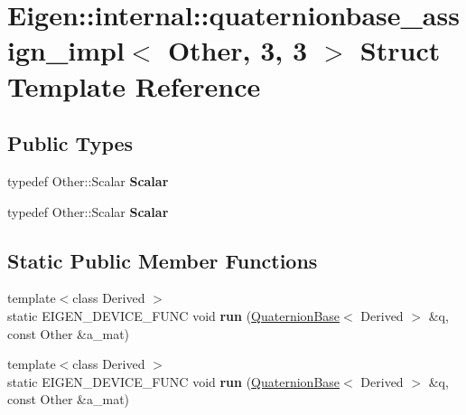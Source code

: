\hypertarget{struct_eigen_1_1internal_1_1quaternionbase__assign__impl_3_01_other_00_013_00_013_01_4}{}\section{Eigen\+:\+:internal\+:\+:quaternionbase\+\_\+assign\+\_\+impl$<$ Other, 3, 3 $>$ Struct Template Reference}
\label{struct_eigen_1_1internal_1_1quaternionbase__assign__impl_3_01_other_00_013_00_013_01_4}
\subsection*{Public Types}
\begin{DoxyCompactItemize}
\item 
\mbox{\label{struct_eigen_1_1internal_1_1quaternionbase__assign__impl_3_01_other_00_013_00_013_01_4_a8fde3fdd643634fe7a9e38b90d80519a}} 
typedef Other\+::\+Scalar {\bfseries Scalar}
\item 
\mbox{\label{struct_eigen_1_1internal_1_1quaternionbase__assign__impl_3_01_other_00_013_00_013_01_4_a8fde3fdd643634fe7a9e38b90d80519a}} 
typedef Other\+::\+Scalar {\bfseries Scalar}
\end{DoxyCompactItemize}
\subsection*{Static Public Member Functions}
\begin{DoxyCompactItemize}
\item 
\mbox{\label{struct_eigen_1_1internal_1_1quaternionbase__assign__impl_3_01_other_00_013_00_013_01_4_a2cb5f61272d2ce9595659a111bf5efb9}} 
{\footnotesize template$<$class Derived $>$ }\\static E\+I\+G\+E\+N\+\_\+\+D\+E\+V\+I\+C\+E\+\_\+\+F\+U\+NC void {\bfseries run} (\hyperlink{group___geometry___module_class_eigen_1_1_quaternion_base}{Quaternion\+Base}$<$ Derived $>$ \&q, const Other \&a\+\_\+mat)
\item 
\mbox{\label{struct_eigen_1_1internal_1_1quaternionbase__assign__impl_3_01_other_00_013_00_013_01_4_a2cb5f61272d2ce9595659a111bf5efb9}} 
{\footnotesize template$<$class Derived $>$ }\\static E\+I\+G\+E\+N\+\_\+\+D\+E\+V\+I\+C\+E\+\_\+\+F\+U\+NC void {\bfseries run} (\hyperlink{group___geometry___module_class_eigen_1_1_quaternion_base}{Quaternion\+Base}$<$ Derived $>$ \&q, const Other \&a\+\_\+mat)
\end{DoxyCompactItemize}


